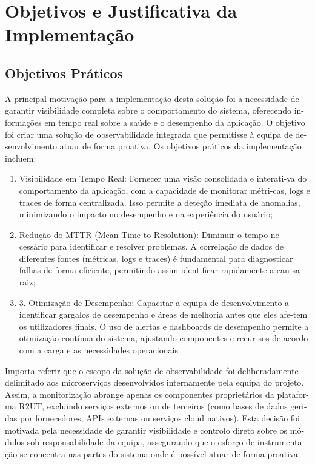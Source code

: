\section{Objetivos e Justificativa da Implementação}

\subsection{Objetivos Práticos}

A principal motivação para a implementação desta solução foi a necessidade de garantir visibilidade completa sobre o comportamento do sistema, oferecendo in-formações em tempo real sobre a saúde e o desempenho da aplicação. O objetivo foi criar uma solução de observabilidade integrada que permitisse à equipa de de-senvolvimento atuar de forma proativa. Os objetivos práticos da implementação incluem:

\begin{enumerate}
    \item Visibilidade em Tempo Real: Fornecer uma visão consolidada e interati-va do comportamento da aplicação, com a capacidade de monitorar métri-cas, logs e traces de forma centralizada. Isso permite a deteção imediata de anomalias, minimizando o impacto no desempenho e na experiência do usuário;
    \item Redução do MTTR (Mean Time to Resolution): Diminuir o tempo ne-cessário para identificar e resolver problemas. A correlação de dados de diferentes fontes (métricas, logs e traces) é fundamental para diagnosticar falhas de forma eficiente, permitindo assim identificar rapidamente a cau-sa raiz;
    \item 3.	Otimização de Desempenho: Capacitar a equipa de desenvolvimento a identificar gargalos de desempenho e áreas de melhoria antes que eles afe-tem os utilizadores finais. O uso de alertas e dashboards de desempenho permite a otimização contínua do sistema, ajustando componentes e recur-sos de acordo com a carga e as necessidades operacionais
\end{enumerate}

Importa referir que o escopo da solução de observabilidade foi deliberadamente delimitado aos microserviços desenvolvidos internamente pela equipa do projeto. Assim, a monitorização abrange apenas os componentes proprietários da platafor-ma R2UT, excluindo serviços externos ou de terceiros (como bases de dados geri-das por fornecedores, APIs externas ou serviços cloud nativos). Esta decisão foi motivada pela necessidade de garantir visibilidade e controlo direto sobre os mó-dulos sob responsabilidade da equipa, assegurando que o esforço de instrumenta-ção se concentra nas partes do sistema onde é possível atuar de forma proativa.

